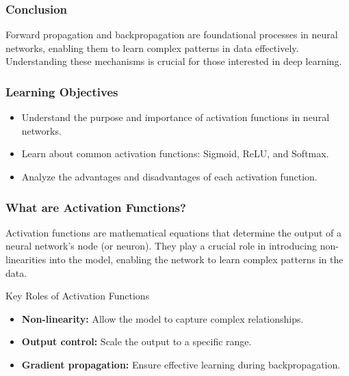 \documentclass[aspectratio=169]{beamer}
\begin{document}
\begin{frame}[fragile]
    \frametitle{Conclusion}
    Forward propagation and backpropagation are foundational processes in neural networks, enabling them to learn complex patterns in data effectively. Understanding these mechanisms is crucial for those interested in deep learning.
\end{frame}

\begin{frame}[fragile]
    \frametitle{Learning Objectives}
    \begin{itemize}
        \item Understand the purpose and importance of activation functions in neural networks.
        \item Learn about common activation functions: Sigmoid, ReLU, and Softmax.
        \item Analyze the advantages and disadvantages of each activation function.
    \end{itemize}
\end{frame}

\begin{frame}[fragile]
    \frametitle{What are Activation Functions?}
    Activation functions are mathematical equations that determine the output of a neural network's node (or neuron). They play a crucial role in introducing non-linearities into the model, enabling the network to learn complex patterns in the data.

    \begin{block}{Key Roles of Activation Functions}
        \begin{itemize}
            \item \textbf{Non-linearity:} Allow the model to capture complex relationships.
            \item \textbf{Output control:} Scale the output to a specific range.
            \item \textbf{Gradient propagation:} Ensure effective learning during backpropagation.
        \end{itemize}
    \end{block}
\end{frame}
\end{document}
